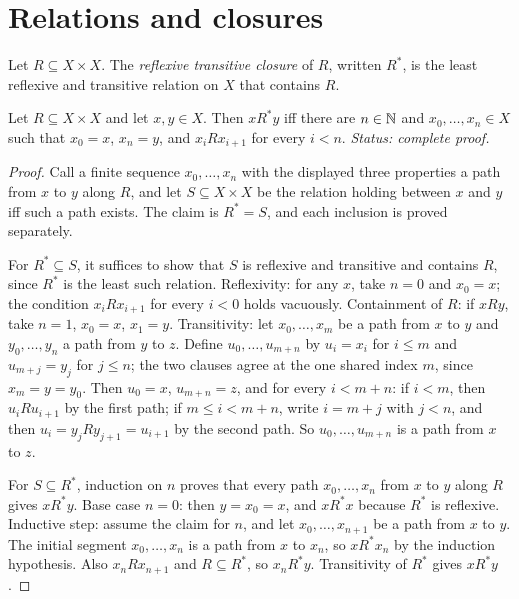 \section{Relations and closures}
\label{sec:strings-05}

\begin{definition}
Let \(R\subseteq X\times X\).  The \emph{reflexive transitive closure} of
\(R\), written \(R^*\), is the least reflexive and transitive relation on
\(X\) that contains \(R\).
\end{definition}

\begin{lemma}
\label{lem:rtc-path-characterization}
Let \(R\subseteq X\times X\) and let \(x,y\in X\).  Then \(xR^*y\) iff there
are \(n\in\mathbb{N}\) and \(x_0,\ldots,x_n\in X\) such that \(x_0=x\), \(x_n=y\),
and \(x_iRx_{i+1}\) for every \(i<n\).
\textit{Status: complete proof.}
\end{lemma}
\begin{proof}
Call a finite sequence \(x_0,\ldots,x_n\) with the displayed three properties
a path from \(x\) to \(y\) along \(R\), and let \(S\subseteq X\times X\) be
the relation holding between \(x\) and \(y\) iff such a path exists.  The
claim is \(R^*=S\), and each inclusion is proved separately.

For \(R^*\subseteq S\), it suffices to show that \(S\) is reflexive and
transitive and contains \(R\), since \(R^*\) is the least such relation.
Reflexivity: for any \(x\), take \(n=0\) and \(x_0=x\); the condition
\(x_iRx_{i+1}\) for every \(i<0\) holds vacuously.  Containment of \(R\): if
\(xRy\), take \(n=1\), \(x_0=x\), \(x_1=y\).  Transitivity: let
\(x_0,\ldots,x_m\) be a path from \(x\) to \(y\) and \(y_0,\ldots,y_n\) a
path from \(y\) to \(z\).  Define \(u_0,\ldots,u_{m+n}\) by \(u_i=x_i\) for
\(i\leq m\) and \(u_{m+j}=y_j\) for \(j\leq n\); the two clauses agree at
the one shared index \(m\), since \(x_m=y=y_0\).  Then \(u_0=x\),
\(u_{m+n}=z\), and for every \(i<m+n\): if \(i<m\), then
\(u_iRu_{i+1}\) by the first path; if \(m\leq i<m+n\), write \(i=m+j\) with
\(j<n\), and then \(u_i=y_jRy_{j+1}=u_{i+1}\) by the second path.  So
\(u_0,\ldots,u_{m+n}\) is a path from \(x\) to \(z\).

For \(S\subseteq R^*\), induction on \(n\) proves that every path
\(x_0,\ldots,x_n\) from \(x\) to \(y\) along \(R\) gives \(xR^*y\).  Base
case \(n=0\): then \(y=x_0=x\), and \(xR^*x\) because \(R^*\) is reflexive.
Inductive step: assume the claim for \(n\), and let \(x_0,\ldots,x_{n+1}\)
be a path from \(x\) to \(y\).  The initial segment \(x_0,\ldots,x_n\) is a
path from \(x\) to \(x_n\), so \(xR^*x_n\) by the induction hypothesis.
Also \(x_nRx_{n+1}\) and \(R\subseteq R^*\), so \(x_nR^*y\).  Transitivity
of \(R^*\) gives \(xR^*y\).
\end{proof}

